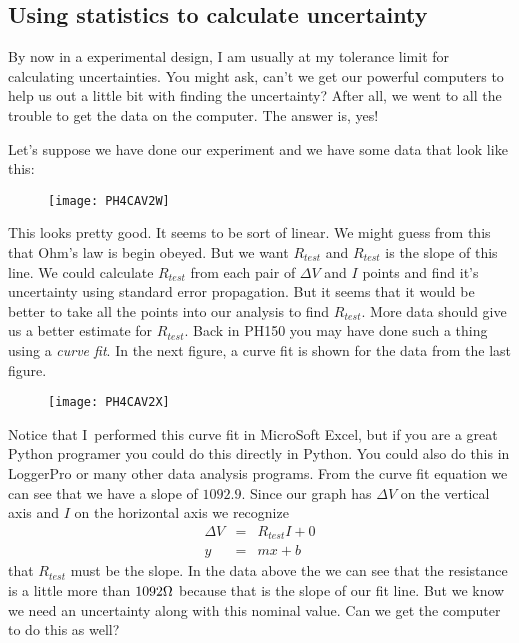\subsection{Using statistics to calculate uncertainty}

By now in a experimental design, I am usually at my tolerance limit for
calculating uncertainties. You might ask, can't we get our powerful
computers to help us out a little bit with finding the uncertainty? After
all, we went to all the trouble to get the data on the computer. The answer
is, yes!

Let's suppose we have done our experiment and we have some data that look
like this: \begin{figure}[h!]
\texttt{[image: PH4CAV2W]}
\end{figure}

This looks pretty good. It seems to be sort of linear. We might guess from
this that Ohm's law is begin obeyed. But we want $R_{test}$ and $R_{test}$
is the slope of this line. We could calculate $R_{test}$ from each pair of $%
\Delta V$ and $I$ points and find it's uncertainty using standard error
propagation. But it seems that it would be better to take all the points
into our analysis to find $R_{test}.$ More data should give us a better
estimate for $R_{test}.$ Back in PH150 you may have done such a thing using
a \emph{curve fit}. In the next figure, a curve fit is shown for the data
from the last figure. \begin{figure}[h!]
\texttt{[image: PH4CAV2X]}
\end{figure}

Notice that I\ performed this curve fit in MicroSoft Excel, but if you are a
great Python programer you could do this directly in Python. You could also
do this in LoggerPro or many other data analysis programs. From the curve
fit equation we can see that we have a slope of $1092.9.$ Since our graph
has $\Delta V$ on the vertical axis and $I$ on the horizontal axis we
recognize 
\begin{eqnarray*}
\Delta V &=&R_{test}I+0 \\
y &=&mx+b
\end{eqnarray*}%
that $R_{test}$ must be the slope. In the data above the we can see that the
resistance is a little more than $1092\unit{%
\Omega%
}$ because that is the slope of our fit line. But we know we need an
uncertainty along with this nominal value. Can we get the computer to do
this as well?

